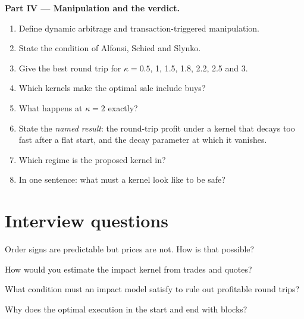 \begin{problem}
\medskip\noindent\textbf{Part IV --- Manipulation and the verdict.}
\begin{enumerate}[resume]
\item Define dynamic arbitrage and transaction-triggered manipulation.
\item State the condition of Alfonsi, Schied and Slynko.
\item Give the best round trip for $\kappa=0.5$, 1, 1.5, 1.8, 2.2, 2.5 and 3.
\item Which kernels make the optimal sale include buys?
\item What happens at $\kappa=2$ exactly?
\item State the \emph{named result}: the round-trip profit under a kernel that decays too fast after a flat start, and the decay parameter at which it vanishes.
\item Which regime is the proposed kernel in?
\item In one sentence: what must a kernel look like to be safe?
\end{enumerate}
\end{problem}

\section{Interview questions}

\begin{interviewq}\label{iq:mx:transient-impact-and-propagator-models:1}
Order signs are predictable but prices are not. How is that possible?
\end{interviewq}

\begin{interviewq}\label{iq:mx:transient-impact-and-propagator-models:2}
How would you estimate the impact kernel from trades and quotes?
\end{interviewq}

\begin{interviewq}\label{iq:mx:transient-impact-and-propagator-models:3}
What condition must an impact model satisfy to rule out profitable round trips?
\end{interviewq}

\begin{interviewq}\label{iq:mx:transient-impact-and-propagator-models:4}
Why does the optimal execution in the  start and end with blocks?
\end{interviewq}

